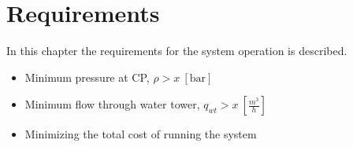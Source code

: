 \chapter{Requirements}
\label{Requirements}

In this chapter the requirements for the system operation is described. 



\begin{itemize}
	\item Minimum pressure at CP, $\rho > x \:[\text{bar}]$
%
	\item Minimum flow through water tower, $q_{wt} > x \:[\frac{m^3}{h}]$
%
	\item Minimizing the total cost of running the system
\end{itemize}